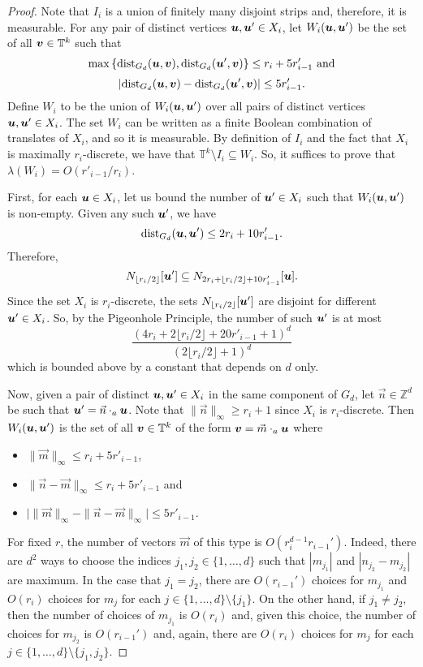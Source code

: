 \documentclass[12pt,a4paper]{amsart}
\numberwithin{equation}{section}
\theoremstyle{definition}
\begin{document}
\begin{proof}
Note that $I_{i}$ is a union of finitely many disjoint strips and, therefore, it is measurable.  For any pair of distinct vertices $\boldsymbol{u},\boldsymbol{u}'\in X_i$, let $W_i(\boldsymbol{u},\boldsymbol{u}')$ be the set of all $\boldsymbol{v}\in \mathbb{T}^k$ such that
\[\max\left\{\operatorname{dist}_{G_d}(\boldsymbol{u},\boldsymbol{v}),\operatorname{dist}_{G_d}(\boldsymbol{u}',\boldsymbol{v})\right\}\leq r_i+5r'_{i-1}\text{ and}\]
\[\left|\operatorname{dist}_{G_d}(\boldsymbol{u},\boldsymbol{v})-\operatorname{dist}_{G_d}(\boldsymbol{u}',\boldsymbol{v})\right|\leq 5r'_{i-1}.\]
Define $W_i$ to be the union of $W_i(\boldsymbol{u},\boldsymbol{u}')$ over all pairs of distinct vertices $\boldsymbol{u},\boldsymbol{u}'\in X_i$. The set $W_i$ can be written as a finite Boolean combination of translates of $X_i$, and so it is measurable. By definition of $I_i$ and the fact that $X_i$ is maximally $r_i$-discrete, we have that $\mathbb{T}^k\setminus I_i\subseteq W_i$. So, it suffices to prove that $\lambda(W_i)= O(r'_{i-1}/r_i)$. 

First, for each $\boldsymbol{u}\in X_i$, let us bound the number of $\boldsymbol{u}'\in X_i$ such that $W_i(\boldsymbol{u},\boldsymbol{u}')$ is non-empty. Given any such $\boldsymbol{u}'$, we have
\[\operatorname{dist}_{G_d}(\boldsymbol{u},\boldsymbol{u}')\leq 2r_i+10r'_{i-1}.\]
Therefore,
\[N_{\lfloor r_i/2\rfloor}[\boldsymbol{u}']\subseteq N_{2r_i+\lfloor r_i/2\rfloor+10r'_{i-1}}[\boldsymbol{u}].\]
Since the set $X_i$ is $r_i$-discrete, the sets $N_{\lfloor r_i/2\rfloor}[\boldsymbol{u}']$ are disjoint for different $\boldsymbol{u}'\in X_i$. So, by the Pigeonhole Principle, the number of such $\boldsymbol{u}'$ is at most
\[\frac{\left(4r_i+2\lfloor r_i/2\rfloor+20r'_{i-1}+1\right)^d}{\left(2\lfloor r_i/2\rfloor+1\right)^d}\]
which is bounded above by a constant that depends on $d$ only.

Now, given a pair of distinct $\boldsymbol{u},\boldsymbol{u}'\in X_i$ in the same component of $G_d$, let $\vec{n}\in \mathbb{Z}^d$ be such that $\boldsymbol{u}'=\vec{n}\cdot_a\boldsymbol{u}$. Note that $\|\vec{n}\|_\infty\geq r_i+1$ since $X_i$ is $r_i$-discrete. Then $W_i(\boldsymbol{u},\boldsymbol{u}')$ is the set of all $\boldsymbol{v}\in \mathbb{T}^k$ of the form $\boldsymbol{v}=\vec{m}\cdot_a\boldsymbol{u}$ where 
\begin{itemize}
\item $\|\vec{m}\|_\infty\leq r_i+5r'_{i-1}$,
\item $\|\vec{n}-\vec{m}\|_\infty\leq r_i+5r'_{i-1}$ and
\item $\big|\|\vec{m}\|_\infty-\|\vec{n}-\vec{m}\|_\infty\big|\leq 5r'_{i-1}$.
\end{itemize}
For fixed $r$, the number of vectors $\vec{m}$ of this type is $O\left(r_i^{d-1}r_{i-1}'\right)$. Indeed, there are $d^2$ ways to choose the indices $j_1,j_2\in\{1,\dots,d\}$ such that $\left|m_{j_1}\right|$ and $\left|n_{j_2}-m_{j_2}\right|$ are maximum. In the case that $j_1=j_2$, there are $O(r_{i-1}')$ choices for $m_{j_1}$ and $O(r_i)$ choices for $m_j$ for each $j\in\{1,\dots,d\}\setminus \{j_1\}$. On the other hand, if $j_1\neq j_2$, then the number of choices of $m_{j_1}$ is $O(r_i)$ and, given this choice, the number of choices for $m_{j_2}$ is $O(r_{i-1}')$ and, again, there are $O(r_i)$ choices for $m_j$ for each $j\in\{1,\dots,d\}\setminus\{j_1,j_2\}$. 


\end{proof}
\end{document}
